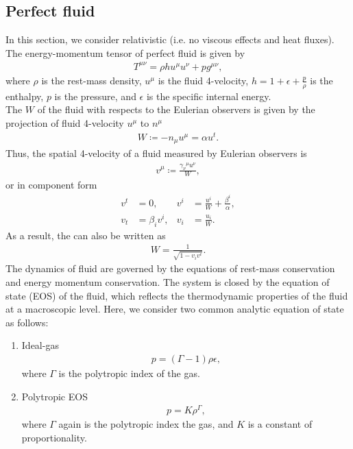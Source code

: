 \subsection{Perfect fluid}
\label{section2.1.1}
In this section, we consider relativistic  (i.e. no viscous effects and heat fluxes).
The energy-momentum tensor of perfect fluid is given by
\begin{align}
    T^{\mu\nu} = \rho h u^\mu u^\nu + p g^{\mu\nu},
\end{align}
where $\rho$ is the rest-mass density, 
$u^\mu$ is the fluid 4-velocity,
$h = 1 + \epsilon + \frac{p}{\rho}$ is the enthalpy, 
$p$ is the pressure, 
and $\epsilon$ is the specific internal energy.\\
The  $W$ of the fluid with respects to the Eulerian observers is given by 
the projection of fluid 4-velocity $u^\mu$ to $n^\mu$
\begin{align}
    W \coloneqq - n_{\mu} u^\mu = \alpha u^t.
\end{align}
Thus, the spatial 4-velocity of a fluid measured by Eulerian observers is
\begin{align}
    v^\mu \coloneqq \frac{\gamma_{\nu}{}^{\mu} u^\nu} {W},
\end{align}
or in component form
\begin{align}
    v^t &= 0, & v^i &=  \frac{u^i}{W} + \frac{\beta^i}{\alpha}, \\
    v_t &= \beta_i v^i, & v_i &= \frac{u_i}{W}.
\end{align}
As a result, the  can also be written as
\begin{align}
    W = \frac{1}{\sqrt{1-v_i v^i}}.
\end{align}
The dynamics of fluid are governed by the equations of rest-mass conservation and energy momentum conservation.
The system is closed by the equation of state (EOS) of the fluid,
which reflects the thermodynamic properties of the fluid at a macroscopic level.
Here, we consider two common analytic equation of state as follows:
\begin{enumerate}
    \item Ideal-gas
    \begin{align}
        p = (\Gamma-1)\rho \epsilon,
    \end{align}
    where $\Gamma$ is the polytropic index of the gas.
    \item Polytropic EOS 
    \begin{align}
        p = K\rho^\Gamma,
    \end{align}
    where $\Gamma$ again is the polytropic index the gas, and $K$ is a constant of proportionality.
\end{enumerate}

